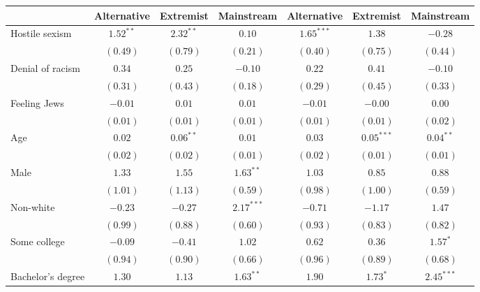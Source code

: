 
\usepackage{booktabs}

\begin{table}
\begin{center}
\begin{tabular}{l c c c c c c}
\toprule
 & Alternative & Extremist & Mainstream & Alternative & Extremist & Mainstream \\
\midrule
Hostile sexism    & $1.52^{**}$  & $2.32^{**}$   & $0.10$        & $1.65^{***}$  & $1.38$       & $-0.28$       \\
                  & $(0.49)$     & $(0.79)$      & $(0.21)$      & $(0.40)$      & $(0.75)$     & $(0.44)$      \\
Denial of racism  & $0.34$       & $0.25$        & $-0.10$       & $0.22$        & $0.41$       & $-0.10$       \\
                  & $(0.31)$     & $(0.43)$      & $(0.18)$      & $(0.29)$      & $(0.45)$     & $(0.33)$      \\
Feeling Jews      & $-0.01$      & $0.01$        & $0.01$        & $-0.01$       & $-0.00$      & $0.00$        \\
                  & $(0.01)$     & $(0.01)$      & $(0.01)$      & $(0.01)$      & $(0.01)$     & $(0.02)$      \\
Age               & $0.02$       & $0.06^{**}$   & $0.01$        & $0.03$        & $0.05^{***}$ & $0.04^{**}$   \\
                  & $(0.02)$     & $(0.02)$      & $(0.01)$      & $(0.02)$      & $(0.01)$     & $(0.01)$      \\
Male              & $1.33$       & $1.55$        & $1.63^{**}$   & $1.03$        & $0.85$       & $0.88$        \\
                  & $(1.01)$     & $(1.13)$      & $(0.59)$      & $(0.98)$      & $(1.00)$     & $(0.59)$      \\
Non-white         & $-0.23$      & $-0.27$       & $2.17^{***}$  & $-0.71$       & $-1.17$      & $1.47$        \\
                  & $(0.99)$     & $(0.88)$      & $(0.60)$      & $(0.93)$      & $(0.83)$     & $(0.82)$      \\
Some college      & $-0.09$      & $-0.41$       & $1.02$        & $0.62$        & $0.36$       & $1.57^{*}$    \\
                  & $(0.94)$     & $(0.90)$      & $(0.66)$      & $(0.96)$      & $(0.89)$     & $(0.68)$      \\
Bachelor's degree & $1.30$       & $1.13$        & $1.63^{**}$   & $1.90$        & $1.73^{*}$   & $2.45^{***}$  \\

\end{tabular}
\end{center}
\end{table}
